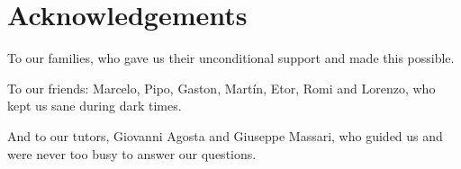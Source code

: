 \chapter*{Acknowledgements}

To our families, who gave us their unconditional support and made this possible.

To our friends: Marcelo, Pipo, Gaston, Martín, Etor, Romi and Lorenzo, who kept us sane during dark times.

And to our tutors, Giovanni Agosta and Giuseppe Massari, who guided us and were never too busy to answer our questions.